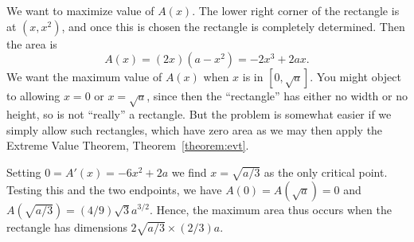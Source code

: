 \begin{example}
    \begin{solution}
    We want to maximize value of $A(x)$.  The lower right corner of the
    rectangle is at $(x,x^2)$, and once this is chosen the rectangle is
    completely determined. Then the area is
    \[
    A(x)=(2x)(a-x^2)=-2x^3+2ax.
    \] 
    We want the maximum value of $A(x)$ when $x$ is in $[0,\sqrt{a}]$. You
    might object to allowing $x=0$ or $x=\sqrt{a}$, since then the
    ``rectangle'' has either no width or no height, so is not ``really'' a
    rectangle. But the problem is somewhat easier if we simply allow such
    rectangles, which have zero area as we may then apply the Extreme
    Value Theorem, Theorem~\ref{theorem:evt}.
    
    Setting $0=A'(x)=-6x^2+2a$ we find $x=\sqrt{a/3}$ as the only critical
    point. Testing this and the two endpoints, we have
    $A(0)=A(\sqrt{a})=0$ and $A(\sqrt{a/3})=(4/9)\sqrt{3}a^{3/2}$. Hence,
    the maximum area thus occurs when the rectangle has dimensions
    $2\sqrt{a/3}\times (2/3)a$.
    \end{solution}
\end{example}
\clearpage
